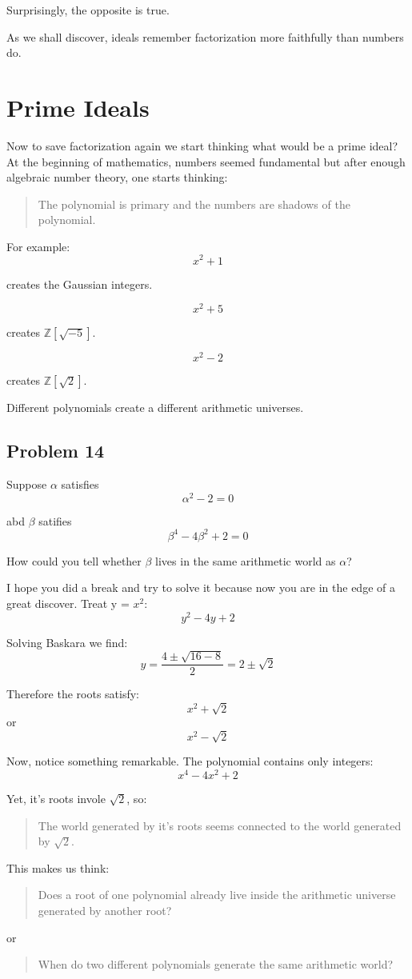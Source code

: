 Surprisingly, the opposite is true.

As we shall discover, ideals remember factorization more faithfully than numbers do.

\section{Prime Ideals}

Now to save factorization again we start thinking what would be a prime ideal?
At the beginning of mathematics, numbers seemed fundamental but after enough algebraic
number theory, one starts thinking:

    \begin{quote}
        The polynomial is primary and the numbers are shadows of the polynomial.
    \end{quote}

For example:
    \[x^2+1\]

creates the Gaussian integers.

    \[x^2+5\]

creates $\mathbb{Z}[\sqrt{-5}]$.

    \[x^2-2\]

creates $\mathbb{Z}[\sqrt{2}]$.

Different polynomials create a different arithmetic universes.

\subsection{Problem 14}
Suppose $\alpha$ satisfies 
    \[\alpha^2-2 = 0\]

abd $\beta$ satifies
    \[\beta^4-4\beta^2+2 = 0\]

How could you tell whether $\beta$ lives in the same arithmetic world as $\alpha$?

I hope you did a break and try to solve it because now you are in the edge of a great discover.
Treat y = $x^2$:
    \[y^2-4y+2\]

Solving Baskara we find:
    \[y = \frac{4\pm\sqrt{16-8}}{2} = 2\pm\sqrt{2}\]

Therefore the roots satisfy:
    \[x^2+\sqrt{2}\]
or
    \[x^2-\sqrt{2}\]

Now, notice something remarkable. The polynomial contains only integers:
    \[x^4-4x^2+2\]

Yet, it's roots invole $\sqrt{2}$, so:
    \begin{quote}
        The world generated by it's roots seems connected to the world generated by $\sqrt{2}$.
    \end{quote}

This makes us think:
    \begin{quote}
        Does a root of one polynomial already live inside the arithmetic universe generated by another root?
    \end{quote}

or

    \begin{quote}
        When do two different polynomials generate the same arithmetic world?
    \end{quote}